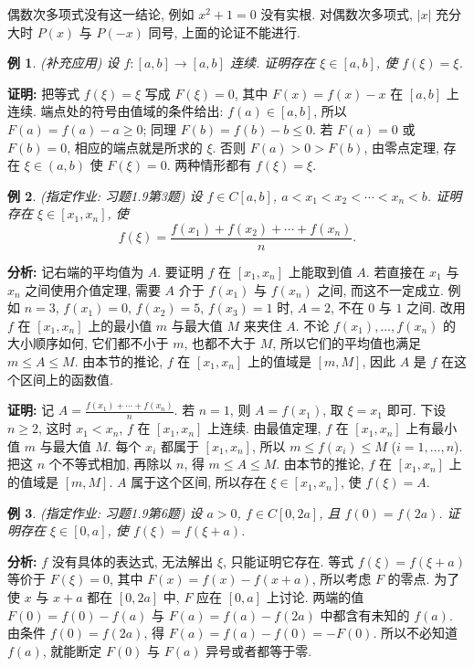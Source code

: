 \documentclass[UTF8,openany]{ctexbook}
\theoremstyle{chinesetextbook}
\newtheorem{example}{例}[section]
\newenvironment{cnproof}{\par\indent\textbf{证明:} \ignorespaces}{\par}
\begin{document}
偶数次多项式没有这一结论, 例如 $x^2+1=0$ 没有实根. 对偶数次多项式, $|x|$ 充分大时 $P(x)$ 与 $P(-x)$ 同号, 上面的论证不能进行.
\begin{example}
\textnormal{(补充应用)} 设 $f:[a,b]\to[a,b]$ 连续. 证明存在 $\xi\in[a,b]$, 使 $f(\xi)=\xi$.
\end{example}
\begin{cnproof}
把等式 $f(\xi)=\xi$ 写成 $F(\xi)=0$, 其中 $F(x)=f(x)-x$ 在 $[a,b]$ 上连续. 端点处的符号由值域的条件给出: $f(a)\in[a,b]$, 所以 $F(a)=f(a)-a\ge0$; 同理 $F(b)=f(b)-b\le0$. 若 $F(a)=0$ 或 $F(b)=0$, 相应的端点就是所求的 $\xi$. 否则 $F(a)>0>F(b)$, 由零点定理, 存在 $\xi\in(a,b)$ 使 $F(\xi)=0$. 两种情形都有 $f(\xi)=\xi$.
\end{cnproof}
\begin{example}
\textnormal{(指定作业: 习题1.9第3题)} 设 $f\in C[a,b]$, $a<x_1<x_2<\cdots<x_n<b$. 证明存在 $\xi\in[x_1,x_n]$, 使
\[
f(\xi)=\frac{f(x_1)+f(x_2)+\cdots+f(x_n)}n.
\]
\end{example}
\par\indent\textbf{分析:} 记右端的平均值为 $A$. 要证明 $f$ 在 $[x_1,x_n]$ 上能取到值 $A$. 若直接在 $x_1$ 与 $x_n$ 之间使用介值定理, 需要 $A$ 介于 $f(x_1)$ 与 $f(x_n)$ 之间, 而这不一定成立. 例如 $n=3$, $f(x_1)=0$, $f(x_2)=5$, $f(x_3)=1$ 时, $A=2$, 不在 $0$ 与 $1$ 之间. 改用 $f$ 在 $[x_1,x_n]$ 上的最小值 $m$ 与最大值 $M$ 来夹住 $A$. 不论 $f(x_1),\ldots,f(x_n)$ 的大小顺序如何, 它们都不小于 $m$, 也都不大于 $M$, 所以它们的平均值也满足 $m\le A\le M$. 由本节的推论, $f$ 在 $[x_1,x_n]$ 上的值域是 $[m,M]$, 因此 $A$ 是 $f$ 在这个区间上的函数值.
\begin{cnproof}
记 $\displaystyle A=\frac{f(x_1)+\cdots+f(x_n)}n$. 若 $n=1$, 则 $A=f(x_1)$, 取 $\xi=x_1$ 即可. 下设 $n\ge2$, 这时 $x_1<x_n$, $f$ 在 $[x_1,x_n]$ 上连续. 由最值定理, $f$ 在 $[x_1,x_n]$ 上有最小值 $m$ 与最大值 $M$. 每个 $x_i$ 都属于 $[x_1,x_n]$, 所以 $m\le f(x_i)\le M$ ($i=1,\ldots,n$). 把这 $n$ 个不等式相加, 再除以 $n$, 得 $m\le A\le M$. 由本节的推论, $f$ 在 $[x_1,x_n]$ 上的值域是 $[m,M]$. $A$ 属于这个区间, 所以存在 $\xi\in[x_1,x_n]$, 使 $f(\xi)=A$.
\end{cnproof}
\begin{example}
\textnormal{(指定作业: 习题1.9第6题)} 设 $a>0$, $f\in C[0,2a]$, 且 $f(0)=f(2a)$. 证明存在 $\xi\in[0,a]$, 使 $f(\xi)=f(\xi+a)$.
\end{example}
\par\indent\textbf{分析:} $f$ 没有具体的表达式, 无法解出 $\xi$, 只能证明它存在. 等式 $f(\xi)=f(\xi+a)$ 等价于 $F(\xi)=0$, 其中 $F(x)=f(x)-f(x+a)$, 所以考虑 $F$ 的零点. 为了使 $x$ 与 $x+a$ 都在 $[0,2a]$ 中, $F$ 应在 $[0,a]$ 上讨论. 两端的值 $F(0)=f(0)-f(a)$ 与 $F(a)=f(a)-f(2a)$ 中都含有未知的 $f(a)$. 由条件 $f(0)=f(2a)$, 得 $F(a)=f(a)-f(0)=-F(0)$. 所以不必知道 $f(a)$, 就能断定 $F(0)$ 与 $F(a)$ 异号或者都等于零.
\end{document}
